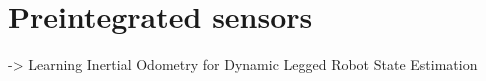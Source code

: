 \chapter{Preintegrated sensors}
\minitoc

\cite{buchanan2021learning} -> Learning Inertial Odometry for Dynamic Legged Robot State Estimation








